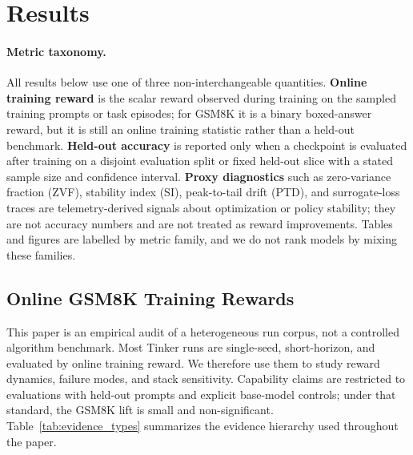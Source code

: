 \section{Results}
\label{sec:results}

\paragraph{Metric taxonomy.}
All results below use one of three non-interchangeable quantities.  \textbf{Online
training reward} is the scalar reward observed during training on the sampled
training prompts or task episodes; for GSM8K it is a binary boxed-answer reward,
but it is still an online training statistic rather than a held-out benchmark.
\textbf{Held-out accuracy} is reported only when a checkpoint is evaluated after
training on a disjoint evaluation split or fixed held-out slice with a stated
sample size and confidence interval.  \textbf{Proxy diagnostics} such as
zero-variance fraction (ZVF), stability index (SI), peak-to-tail drift (PTD),
and surrogate-loss traces are telemetry-derived signals about optimization or
policy stability; they are not accuracy numbers and are not treated as reward
improvements.  Tables and figures are labelled by metric family, and we do not
rank models by mixing these families.



\subsection{Online GSM8K Training Rewards}
\label{sec:main_results}

This paper is an empirical audit of a heterogeneous run corpus, not a controlled
algorithm benchmark. Most Tinker runs are single-seed, short-horizon, and
evaluated by online training reward. We therefore use them to study reward
dynamics, failure modes, and stack sensitivity. Capability claims are restricted
to evaluations with held-out prompts and explicit base-model controls; under that
standard, the GSM8K lift is small and non-significant. Table~\ref{tab:evidence_types}
summarizes the evidence hierarchy used throughout the paper.

